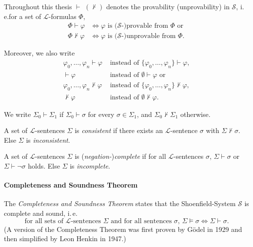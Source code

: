 Throughout this thesis $\vdash$ $(\nvdash)$ denotes the provability (unprovability) in $\mathcal{S}$, i.\,e.\@ for a set of $\mathcal{L}$-formulas $\Phi$, 
\begin{align*}
\Phi\vdash \varphi & \Leftrightarrow \varphi \text{ is }(\mathcal{S}\text{-)provable from }\Phi \text{ or } \\
\Phi\nvdash \varphi &\Leftrightarrow \varphi \text{ is }(\mathcal{S}\text{-)unprovable from }\Phi .
\end{align*} 


Moreover, we also write 
\begin{align*}
\varphi_0, \ldots, \varphi_n \vdash \varphi &\text{ instead of }\lbrace \varphi_0, \ldots, \varphi_n \rbrace \vdash \varphi, \\
\vdash \varphi &\text{ instead of } \emptyset \vdash \varphi \text{ or} \\
\varphi_0, \ldots, \varphi_n \nvdash \varphi &\text{ instead of }\lbrace \varphi_0, \ldots, \varphi_n \rbrace \nvdash \varphi,\\
\nvdash \varphi &\text{ instead of } \emptyset \nvdash \varphi. 
\end{align*}

We write $\Sigma_0 \vdash \Sigma_1$ if $\Sigma_0 \vdash \sigma$ for every $\sigma \in \Sigma_1$, and $\Sigma_0 \nvdash \Sigma_1$ otherwise. 

A set of $\mathcal{L}$-sentences $\Sigma$ is \textit{consistent} if there exists an $\mathcal{L}$-sentence $\sigma$ with $\Sigma \nvdash \sigma$. Else $\Sigma$ is \textit{inconsistent}.

A set of $\mathcal{L}$-sentences $\Sigma$ is (\textit{negation-})\textit{complete} if for all $\mathcal{L}$-sentences $\sigma$, $\Sigma\vdash \sigma$ or $\Sigma\vdash \lnot \sigma$ holds. Else $\Sigma$ is \textit{incomplete}.


\paragraph{Completeness and Soundness Theorem}

The \textit{Completeness and Soundness Theorem} states that the Shoenfield-System $\mathcal{S}$ is complete and sound, i.\,e.\@
\[ \text{for all sets of }\mathcal{L}\text{-sentences }\Sigma\text{ and for all sentences }\sigma\text{, }\Sigma \vDash \sigma \Leftrightarrow \Sigma \vdash \sigma. \]
(A version of the Completeness Theorem was first proven by G\"odel in 1929 and then simplified by Leon Henkin in 1947.)


